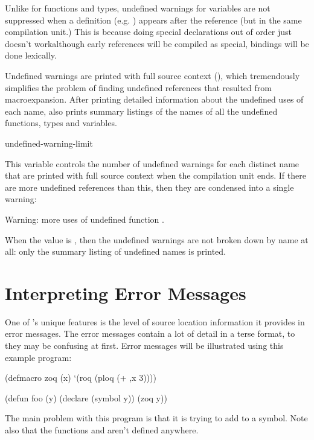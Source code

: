 Unlike for functions and types, undefined warnings for variables are
not suppressed when a definition (e.g. ) appears after
the reference (but in the same compilation unit.)  This is because
doing special declarations out of order just doesn't
work\dash{}although early references will be compiled as special,
bindings will be done lexically.

Undefined warnings are printed with full source context
(), which tremendously simplifies the problem
of finding undefined references that resulted from macroexpansion.
After printing detailed information about the undefined uses of each
name,  also prints summary listings of the
names of all the undefined functions, types and variables.

\begin{defvar}{}{undefined-warning-limit}
  
  This variable controls the number of undefined warnings for each
  distinct name that are printed with full source context when the
  compilation unit ends.  If there are more undefined references than
  this, then they are condensed into a single warning:
  \begin{example}
    Warning:  more uses of undefined function .
  \end{example}
  When the value is , then the undefined warnings are not
  broken down by name at all: only the summary listing of undefined
  names is printed.
\end{defvar}


\section{Interpreting Error Messages}
\label{error-messages}

One of \python{}'s unique features is the level of source location
information it provides in error messages.  The error messages contain
a lot of detail in a terse format, to they may be confusing at first.
Error messages will be illustrated using this example program:
\begin{lisp}
(defmacro zoq (x)
  `(roq (ploq (+ ,x 3))))

(defun foo (y)
  (declare (symbol y))
  (zoq y))
\end{lisp}
The main problem with this program is that it is trying to add  to a
symbol.  Note also that the functions  and  aren't defined
anywhere.


